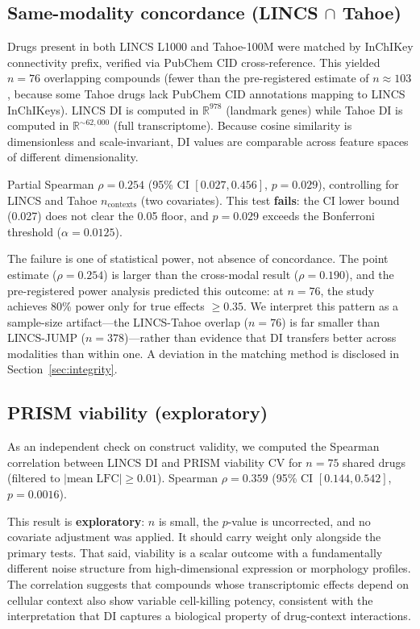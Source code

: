 \documentclass[11pt]{article}
\begin{document}
\subsection{Same-modality concordance (LINCS \texorpdfstring{$\cap$}{∩} Tahoe)}

Drugs present in both LINCS L1000 and Tahoe-100M were matched by
InChIKey connectivity prefix, verified via PubChem CID cross-reference.
This yielded $n = 76$ overlapping compounds (fewer than the
pre-registered estimate of $n \approx 103$, because some Tahoe drugs
lack PubChem CID annotations mapping to LINCS InChIKeys).  LINCS DI is
computed in $\mathbb{R}^{978}$ (landmark genes) while Tahoe DI is
computed in $\mathbb{R}^{\sim 62{,}000}$ (full transcriptome).  Because
cosine similarity is dimensionless and scale-invariant, DI values are
comparable across feature spaces of different dimensionality.

Partial Spearman $\rho = 0.254$ (95\% CI $[0.027, 0.456]$,
$p = 0.029$), controlling for LINCS and Tahoe $n_{\mathrm{contexts}}$
(two covariates).  This test \textbf{fails}: the CI lower bound
(0.027) does not clear the 0.05 floor, and $p = 0.029$ exceeds the
Bonferroni threshold ($\alpha = 0.0125$).

The failure is one of statistical power, not absence of concordance.
The point estimate ($\rho = 0.254$) is larger than the cross-modal result
($\rho = 0.190$), and the pre-registered power analysis predicted this
outcome: at $n = 76$, the study achieves 80\% power only for true
effects $\geq 0.35$.  We interpret this pattern as a sample-size
artifact---the LINCS-Tahoe overlap ($n = 76$) is far smaller than
LINCS-JUMP ($n = 378$)---rather than evidence that DI transfers better
across modalities than within one.  A deviation in the matching method
is disclosed in Section~\ref{sec:integrity}.

\subsection{PRISM viability (exploratory)}

As an independent check on construct validity, we computed the Spearman
correlation between LINCS DI and PRISM viability CV for $n = 75$ shared
drugs (filtered to $|\mathrm{mean\;LFC}| \geq 0.01$).  Spearman
$\rho = 0.359$ (95\% CI $[0.144, 0.542]$, $p = 0.0016$).

This result is \textbf{exploratory}: $n$ is small, the $p$-value is
uncorrected, and no covariate adjustment was applied.  It should carry
weight only alongside the primary tests.  That said, viability is a
scalar outcome with a fundamentally different noise structure from
high-dimensional expression or morphology profiles.  The correlation
suggests that compounds whose transcriptomic effects depend on cellular
context also show variable cell-killing potency, consistent with the
interpretation that DI captures a biological property of drug-context
interactions.
\end{document}
